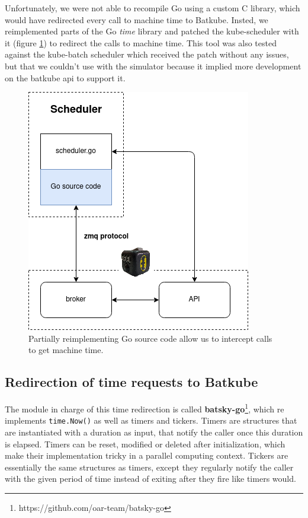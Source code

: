 Unfortunately, we were not able to recompile Go using a custom C library, which
would have redirected every call to machine time to Batkube. Insted, we
reimplemented parts of the Go \textit{time} library and patched the
kube-scheduler with it (figure \ref{fig:patch-time}) to redirect the calls to
machine time.  This tool was also tested against the kube-batch scheduler which
received the patch without any issues, but that we couldn't use with the
simulator because it implied more development on the batkube api to support it.

\begin{figure}[]
	\centering
	\includegraphics[scale=0.73]{imgs/time-hijack-Go.png}
	\caption{Partially reimplementing Go source code allow us to intercept calls to get machine time.}
	\label{fig:patch-time}
\end{figure}

\subsection{Redirection of time requests to Batkube}

The module in charge of this time redirection is called
\textbf{batsky-go}\footnote{https://github.com/oar-team/batsky-go}, which re
implements \texttt{time.Now()} as well as timers and tickers. Timers are
structures that are instantiated with a duration as input, that notify the
caller once this duration is elapsed. Timers can be reset, modified or deleted
after initialization, which make their implementation tricky in a parallel
computing context. Tickers are essentially the same structures as timers,
except they regularly notify the caller with the given period of time instead
of exiting after they fire like timers would.

